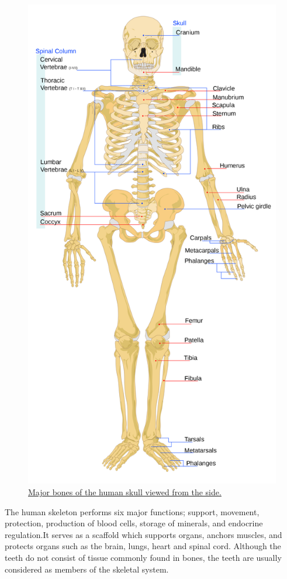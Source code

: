 \begin{figure}

{\centering \includegraphics[width=0.7\linewidth]{./figures/locomotion/Human_skull_side_simplified_(bones)} 

}

\caption{\href{https://commons.wikimedia.org/wiki/File:Human_skull_side_simplified_(bones).svg}{Major bones of the human skull viewed from the side.}}\label{fig:humanskull}
\end{figure}

The human skeleton performs six major functions; support, movement, protection, production of blood cells, storage of minerals, and endocrine regulation.It serves as a scaffold which supports organs, anchors muscles, and protects organs such as the brain, lungs, heart and spinal cord. Although the teeth do not consist of tissue commonly found in bones, the teeth are usually considered as members of the skeletal system.

